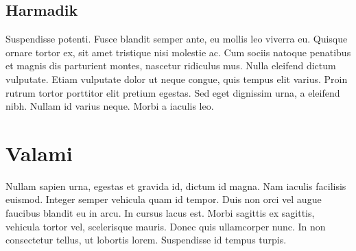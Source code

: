 \documentclass[12pt,a4paper]{report}
\begin{document}
\section{Harmadik}

Suspendisse potenti. Fusce blandit semper ante, eu mollis leo viverra eu. Quisque ornare tortor ex, sit amet tristique nisi molestie ac. Cum sociis natoque penatibus et magnis dis parturient montes, nascetur ridiculus mus. Nulla eleifend dictum vulputate. Etiam vulputate dolor ut neque congue, quis tempus elit varius. Proin rutrum tortor porttitor elit pretium egestas. Sed eget dignissim urna, a eleifend nibh. Nullam id varius neque. Morbi a iaculis leo.















\appendix

\chapter{Valami}


Nullam sapien urna, egestas et gravida id, dictum id magna. Nam iaculis facilisis euismod. Integer semper vehicula quam id tempor. Duis non orci vel augue faucibus blandit eu in arcu. In cursus lacus est. Morbi sagittis ex sagittis, vehicula tortor vel, scelerisque mauris. Donec quis ullamcorper nunc. In non consectetur tellus, ut lobortis lorem. Suspendisse id tempus turpis.
\end{document}
